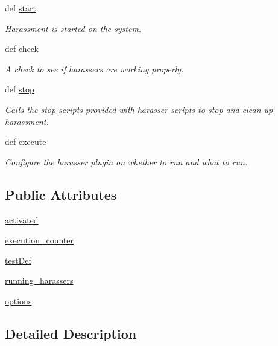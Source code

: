 \begin{DoxyCompactItemize}
def \hyperlink{classHarasser_1_1Harasser_aed32fb178974a05a4f4be00957599c67}{start}
\begin{DoxyCompactList}\small\item\em Harassment is started on the system. \end{DoxyCompactList}\item 
def \hyperlink{classHarasser_1_1Harasser_ab5ea4c244f800d83bcffabca0c2f0177}{check}
\begin{DoxyCompactList}\small\item\em A check to see if harassers are working properly. \end{DoxyCompactList}\item 
def \hyperlink{classHarasser_1_1Harasser_aad6ad8458a1afbb7ca4859f6d8b9d803}{stop}
\begin{DoxyCompactList}\small\item\em Calls the stop-\/scripts provided with harasser scripts to stop and clean up harassment. \end{DoxyCompactList}\item 
def \hyperlink{classHarasser_1_1Harasser_a5e76810f26871d800420089480269fb9}{execute}
\begin{DoxyCompactList}\small\item\em Configure the harasser plugin on whether to run and what to run. \end{DoxyCompactList}\end{DoxyCompactItemize}
\subsection*{Public Attributes}
\begin{DoxyCompactItemize}
\item 
\hyperlink{classHarasser_1_1Harasser_af1ed57b62f3b8cf35af5bb750c18afe4}{activated}
\item 
\hyperlink{classHarasser_1_1Harasser_a96c7c91ef5d33784056c567ba49a2c8a}{execution\-\_\-counter}
\item 
\hyperlink{classHarasser_1_1Harasser_adddf34aabbc91934437e1a30134224c3}{test\-Def}
\item 
\hyperlink{classHarasser_1_1Harasser_ad9d37d39c99222e899af613a573ecd15}{running\-\_\-harassers}
\item 
\hyperlink{classHarasser_1_1Harasser_ab9ed73d71cdaae7d9b5cc81548823527}{options}
\end{DoxyCompactItemize}


\subsection{Detailed Description}


